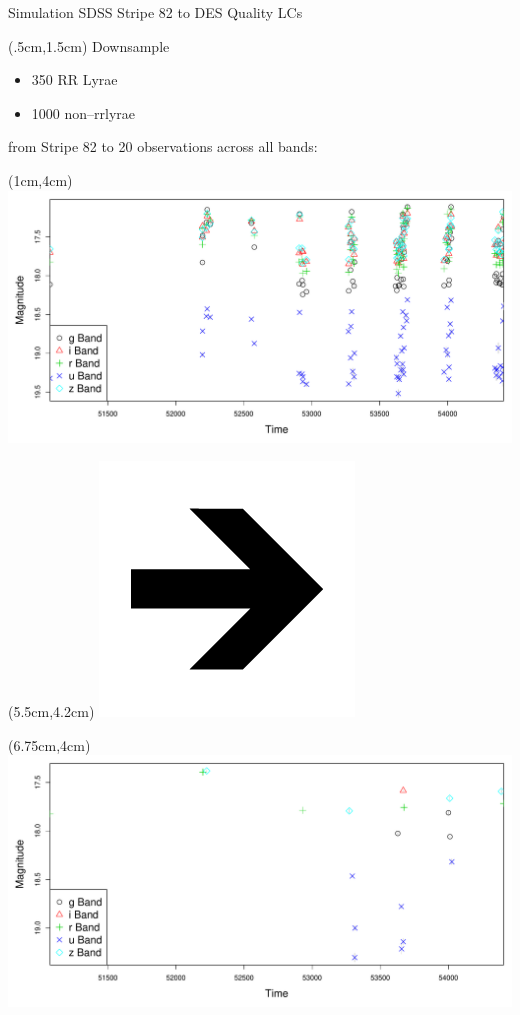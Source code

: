 \documentclass[12pt]{beamer}
\begin{document}
\begin{frame}{Simulation SDSS Stripe 82 to DES Quality LCs}

  \begin{textblock*}{12cm}(.5cm,1.5cm) %
    Downsample
    \begin{itemize}
    \item 350 RR Lyrae
    \item 1000 non--rrlyrae
    \end{itemize}
    from Stripe 82 to 20 observations across all bands:
\end{textblock*}

  \begin{textblock*}{3cm}(1cm,4cm) %
\includegraphics[scale=.15]{figs/unfolded_13350.pdf}
\end{textblock*}


  \begin{textblock*}{3cm}(5.5cm,4.2cm) %
\includegraphics[scale=.15]{figs/rightarrow.png}
\end{textblock*}

  \begin{textblock*}{3cm}(6.75cm,4cm) %
\includegraphics[scale=.15]{figs/unfolded_13350down.pdf}
\end{textblock*}


\end{frame}
\end{document}
